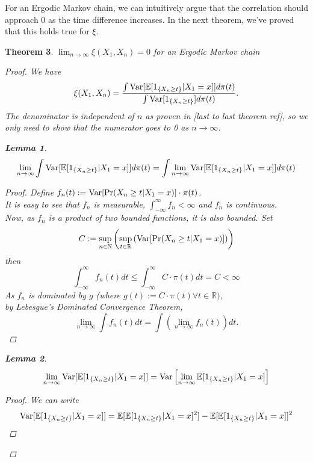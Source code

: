 \documentclass{article}
\newtheorem{theorem}{Theorem}[section]
\newtheorem{lemma}[theorem]{Lemma}
\begin{document}
	For an Ergodic Markov chain, we can intuitively argue that the correlation should approach $0$ as the time difference increases.
	In the next theorem, we've proved that this holds true for $\xi$.
	\begin{theorem}
		$\lim_{n \rightarrow \infty} \xi(X_1, X_{n}) = 0$ for an Ergodic Markov chain
		\begin{proof}
			We have
			\begin{equation*}
				\xi(X_1, X_{n}) = \frac{\int \text{Var}[\mathbb{E}[1_{\{X_{n} \geq t\}}|X_1=x]] d\pi(t)}{\int \text{Var}[1_{\{X_{n} \geq t\}}] d\pi(t)}.
			\end{equation*}
			The denominator is independent of $n$ as proven in [last to last theorem ref], so we only need to show that the numerator goes to 0 as $n \rightarrow \infty$.\\
			\begin{lemma}
				$$\lim_{n \rightarrow \infty} \int \text{Var}[\mathbb{E}[1_{\{X_{n} \geq t\}}|X_1=x]] d\pi(t) = \int \lim_{n \rightarrow \infty}\text{Var}[\mathbb{E}[1_{\{X_{n} \geq t\}}|X_1=x]] d\pi(t)$$
				\begin{proof}
					Define $f_n(t) := \text{Var}[\Pr(X_{n} \geq t | X_{1} = x)] \cdot \pi(t)$. \\
					It is easy to see that $f_n$ is measurable, $\int_{-\infty}^{\infty} f_n < \infty$ and $f_n$ is continuous.\\
					Now, as $f_n$ is a product of two bounded functions, it is also bounded.
					Set
					$$ C:= \sup_{n \in \mathbb{N}} \left(\sup_{t \in \mathbb{R}} \left(\text{Var}[\Pr(X_{n} \geq t | X_{1} = x)]\right)\right)$$
					then
					$$\int_{-\infty}^{\infty} f_n(t)dt \leq \int_{-\infty}^{\infty} C\cdot\pi(t)dt = C < \infty$$
					As $f_n$ is dominated by $g$ (where $g(t) := C\cdot\pi(t) \forall t \in \mathbb{R})$, \\
					by Lebesgue's Dominated Convergence Theorem,
					$$\lim_{n \rightarrow \infty} \int f_n(t) dt = \int \left(\lim_{n \rightarrow \infty} f_n(t)\right) dt.$$
				\end{proof}
			\end{lemma}
			\begin{lemma}
				$$\lim_{n \rightarrow \infty} \text{Var}[\mathbb{E}[1_{\{X_{n} \geq t\}}|X_1=x]] = \text{Var}\left[\lim_{n \rightarrow \infty} \mathbb{E}[1_{\{X_{n} \geq t\}}|X_1=x]\right]$$
				\begin{proof}
					We can write
					\begin{align*}
						\Var[\mathbb{E}[1_{\{X_{n} \geq t\}}|X_1=x]] &= \mathbb{E}[\mathbb{E}[1_{\{X_{n} \geq t\}}|X_1=x]^2] - \mathbb{E}[\mathbb{E}[1_{\{X_{n} \geq t\}}|X_1=x]]^2 \\

\end{align*}
\end{proof}
\end{lemma}
\end{proof}
\end{theorem}
\end{document}
